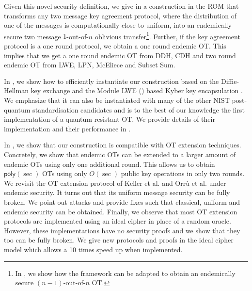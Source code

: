 Given this novel security definition, we give in  a construction in the ROM that transforms any two message key agreement protocol, where the distribution of one of the messages is computationally close to uniform, into an endemically secure two message $1$-out-of-$n$ oblivious transfer\footnote{In , we show how the framework can be adapted to obtain an endemically secure $(n-1)$-out-of-$n$ OT.}. Further, 
if the key agreement protocol is a one round protocol, we obtain a one round endemic OT. This implies that we get a one round endemic OT from DDH, CDH and two round endemic OT from LWE, LPN, McEliece and Subset Sum.

In , we show how to efficiently instantiate our construction based on the Diffie-Hellman key exchange and the Module LWE (\MLWE) based Kyber key encapsulation \cite{NISTPQC-R1:CRYSTALS-KYBER17}. We emphasize that it can also be instantiated with many of the other NIST post-quantum standardisation candidates and is to the best of our knowledge the first implementation of a quantum resistant OT. We provide details of their implementation and their performance in .

In , we show that our construction is compatible with OT extension techniques. Concretely, we show that endemic OTs can be extended to a larger amount of endemic OTs using only one additional round. This allows us to obtain $\mathsf{poly}(\sec)$ OTs using only $O(\sec)$ public key operations in only two rounds. We revisit the OT extension protocol of Keller et al. and Orr{\`u} et al. \cite{C:KelOrsSch15,RSA:OrrOrsSch17} under endemic security. It turns out that its uniform message security can be fully broken. We point out attacks and provide fixes such that classical, uniform and endemic security can be obtained. Finally, we observe that most OT extension protocols are implemented using an ideal cipher in place of a random oracle. However, these implementations have no security proofs and we show that they too can be fully broken. We give new protocols and proofs in the ideal cipher model which allows a 10 times speed up when implemented. 


